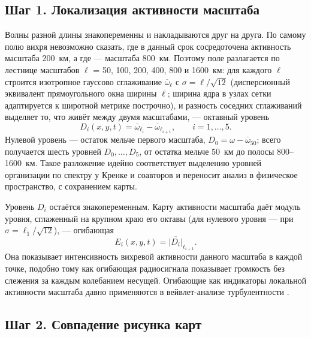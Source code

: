 \documentclass[11pt,a4paper]{article}
\begin{document}
\subsection{Шаг 1. Локализация активности масштаба}

Волны разной длины знакопеременны и накладываются друг на друга. По самому полю вихря невозможно сказать, где в данный срок сосредоточена активность масштаба 200~км, а где --- масштаба 800~км. Поэтому поле разлагается по лестнице масштабов $\ell$ = 50, 100, 200, 400, 800 и 1600~км: для каждого $\ell$ строится изотропное гауссово сглаживание $\overline{\omega}_\ell$ с $\sigma=\ell/\sqrt{12}$ (дисперсионный эквивалент прямоугольного окна ширины $\ell$; ширина ядра в узлах сетки адаптируется к широтной метрике построчно), и разность соседних сглаживаний выделяет то, что живёт между двумя масштабами, --- октавный уровень
\begin{equation}
\label{eq:level}
D_i(x,y,t)=\overline{\omega}_{\ell_i}-\overline{\omega}_{\ell_{i+1}},\qquad i=1,\dots,5.
\end{equation}
Нулевой уровень --- остаток мельче первого масштаба, $D_0=\omega-\overline{\omega}_{50}$; всего получается шесть уровней $D_0,\dots,D_5$, от остатка мельче 50~км до полосы 800--1600~км. Такое разложение идейно соответствует выделению уровней организации по спектру у Кренке и соавторов \cite{Krenke2019} и переносит анализ в физическое пространство, с сохранением карты.

Уровень $D_i$ остаётся знакопеременным. Карту активности масштаба даёт модуль уровня, сглаженный на крупном краю его октавы (для нулевого уровня --- при $\sigma=\ell_1/\sqrt{12}$), --- огибающая
\begin{equation}
\label{eq:env}
E_i(x,y,t)=\overline{|D_i|}_{\ell_{i+1}}.
\end{equation}
Она показывает интенсивность вихревой активности данного масштаба в каждой точке, подобно тому как огибающая радиосигнала показывает громкость без слежения за каждым колебанием несущей. Огибающие как индикаторы локальной активности масштаба давно применяются в вейвлет-анализе турбулентности \cite{Farge1992}.

\subsection{Шаг 2. Совпадение рисунка карт}
\end{document}
